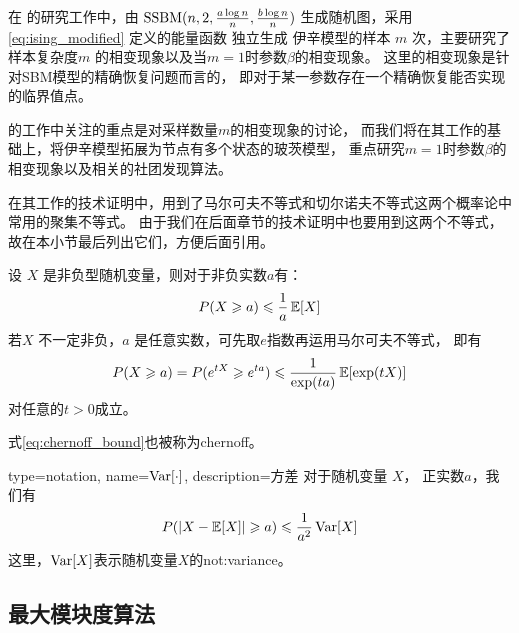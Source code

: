 在\citet{ye2020exact} 的研究工作中，由 $\operatorname{SSBM}(n,2,\frac{a \log n}{n}, \frac{b \log n}{n})$
生成随机图，采用 \eqref{eq:ising_modified} 定义的能量函数
独立生成 伊辛模型的样本 $m$ 次，主要研究了样本复杂度$m$
的相变现象以及当$m=1$时参数$\beta$的相变现象。
这里的相变现象是针对SBM模型的精确恢复问题而言的，
即对于某一参数存在一个精确恢复能否实现的临界值点。

\citet{ye2020exact} 的工作中关注的重点是对采样数量$m$的相变现象的讨论，
而我们将在其工作的基础上，将伊辛模型拓展为节点有多个状态的玻茨模型，
重点研究$m=1$时参数$\beta$的相变现象以及相关的社团发现算法。

\citet{ye2020exact} 在其工作的技术证明中，用到了马尔可夫不等式和切尔诺夫不等式这两个概率论中常用的聚集不等式。
由于我们在后面章节的技术证明中也要用到这两个不等式，故在本小节最后列出它们，方便后面引用。

\begin{lemma} 
  设 $X$ 是非负型随机变量，则对于非负实数$a$有：
  \begin{equation}
    P(X\geqslant a) \leqslant {1 \over a} \operatorname{\mathbb{E}}[X]   
  \end{equation}
   若$X$ 不一定非负，$a$ 是任意实数，可先取$e$指数再运用马尔可夫不等式，
   即有
   \begin{equation}\label{eq:chernoff_bound}
    P(X\geqslant a) = P(e^{tX} \geqslant e^{ta}) \leqslant { 1 \over \exp(ta)} \operatorname{\mathbb{E}}[\exp(tX)]
   \end{equation}
   对任意的$t>0$成立。

   式\eqref{eq:chernoff_bound}也被称为\gls{chernoff}。
\end{lemma}
\begin{lemma}
{
  type=notation,
  name={$\operatorname{\mathrm{Var}}[\cdot]$},
  description={方差}
}
  对于随机变量 $X$， 正实数$a$，我们有
  \begin{equation}
    P(\lvert X-\operatorname{\mathbb{E}}[X]\rvert \geqslant a) \leqslant {1 \over a^2} \operatorname{\mathrm{Var}}[X]
  \end{equation}
  这里，$\operatorname{\mathrm{Var}}[X]$表示随机变量$X$的\glsdesc{not:variance}。
\end{lemma}



\subsection{最大模块度算法}

